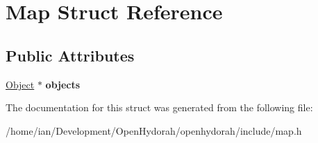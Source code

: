 \hypertarget{structMap}{\section{Map Struct Reference}
\label{structMap}
}
\subsection*{Public Attributes}
\begin{DoxyCompactItemize}
\item 
\hypertarget{structMap_a0dc926978e941c8ffd6f198c4156360e}{\hyperlink{structSObject}{Object} $\ast$ {\bfseries objects}}\label{structMap_a0dc926978e941c8ffd6f198c4156360e}

\end{DoxyCompactItemize}


The documentation for this struct was generated from the following file\-:\begin{DoxyCompactItemize}
\item 
/home/ian/\-Development/\-Open\-Hydorah/openhydorah/include/map.\-h\end{DoxyCompactItemize}
